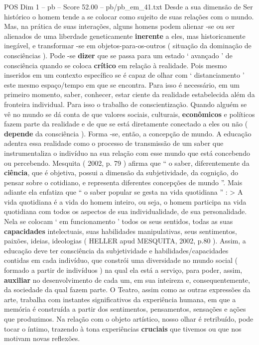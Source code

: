 \begin{textsample}{POS Dim 1 – pb – Score 52.00 – pb/pb\_em\_41.txt}
Desde a sua dimensão de Ser histórico o homem tende a se colocar como sujeito de suas relações com o mundo.
Mas, na prática de suas interações, alguns homens podem alienar -se ou ser alienados de uma liberdade geneticamente \textbf{inerente} a eles, mas historicamente inegável, e transformar -se em objetos-para-os-outros ( situação da dominação de consciências ).
Pode -se \textbf{dizer} que se passa para um estado ‘ avançado ’ de consciência quando se coloca \textbf{crítico} em relação à realidade.
Pois mesmo inseridos em um contexto específico se é capaz de olhar com ‘ distanciamento ’ este mesmo espaço/tempo em que se encontra.
Para isso é necessário, em um primeiro momento, saber, conhecer, estar ciente da realidade estabelecida além da fronteira individual.
Para isso o trabalho de conscientização.
Quando alguém se vê no mundo se dá conta de que valores sociais, culturais, \textbf{econômicos} e políticos fazem parte da realidade e de que se está diretamente conectado a eles ou não ( \textbf{depende} da consciência ).
Forma -se, então, a concepção de mundo.
A educação adentra essa realidade como o processo de transmissão de um saber que instrumentaliza o indivíduo na sua relação com esse mundo que está concebendo ou percebendo.
Mesquita ( 2002, p. 79 ) afirma que “ o saber, diferentemente da \textbf{ciência}, que é objetiva, possui a dimensão da subjetividade, da cognição, do pensar sobre o cotidiano, e representa diferentes concepções de mundo ”.
Mais adiante ela enfatiza que “ o saber popular se gesta na vida quotidiana ” : > A vida quotidiana é a vida do homem inteiro, ou seja, o homem participa na vida quotidiana com todos os aspectos de sua individualidade, de sua personalidade.
Nela se colocam ‘ em funcionamento ’ todos os seus sentidos, todas as suas \textbf{capacidades} intelectuais, suas habilidades manipulativas, seus sentimentos, paixões, ideias, ideologias ( HELLER apud MESQUITA, 2002, p.80 ).
Assim, a educação deve ter consciência da subjetividade e habilidades/capacidades contidas em cada indivíduo, que constrói uma diversidade no mundo social ( formado a partir de indivíduos ) na qual ela está a serviço, para poder, assim, \textbf{auxiliar} no desenvolvimento de cada um, em sua inteireza e, consequentemente, da sociedade da qual fazem parte.
O Teatro, assim como as outras expressões da arte, trabalha com instantes significativos da experiência humana, em que a memória é construída a partir dos sentimentos, pensamentos, sensações e ações que produzimos.
Na relação com o objeto artístico, nosso olhar é retribuído, pode tocar o íntimo, trazendo à tona experiências \textbf{cruciais} que tivemos ou que nos motivam novas reflexões.

\end{textsample}
